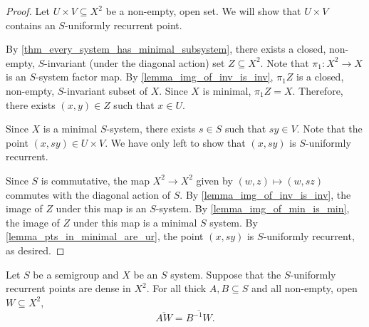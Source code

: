 \begin{proof}
\leanok{}
    Let $U \times V \subseteq X^2$ be a non-empty, open set. We will show that $U \times V$ contains an $S$-uniformly recurrent point. 
    
    By \cref{thm_every_system_has_minimal_subsystem}, there exists a closed, non-empty, $S$-invariant (under the diagonal action) set $Z \subseteq X^2$.  Note that $\pi_1: X^2 \to X$ is an $S$-system factor map.  By \cref{lemma_img_of_inv_is_inv}, $\pi_1 Z$ is a closed, non-empty, $S$-invariant subset of $X$.  Since $X$ is minimal, $\pi_1 Z = X$.  Therefore, there exists $(x,y) \in Z$ such that $x \in U$. 
    
    Since $X$ is a minimal $S$-system, there exists $s \in S$ such that $sy \in V$.  Note that the point $(x,sy) \in U \times V$.  We have only left to show that $(x,sy)$ is $S$-uniformly recurrent.
    
    
    Since $S$ is commutative, the map $X^2 \to X^2$ given by $(w,z) \mapsto (w,sz)$ commutes with the diagonal action of $S$.  By \cref{lemma_img_of_inv_is_inv}, the image of $Z$ under this map is an $S$-system.  By \cref{lemma_img_of_min_is_min}, the image of $Z$ under this map is a minimal $S$ system.  By \cref{lemma_pts_in_minimal_are_ur}, the point $(x,sy)$ is $S$-uniformly recurrent, as desired.
\end{proof}

\begin{lemma}
    \label{lemma_forward_backward_set_orb_clos_coincide}
    \leanok{}
    Let $S$ be a semigroup and $X$ be an $S$ system. Suppose that the $S$-uniformly recurrent points are dense in $X^2$.  For all thick $A, B \subseteq S$ and all non-empty, open $W \subseteq X^2$,
    \[\overline{AW} = \overline{B^{-1} W}.\]
\end{lemma}

